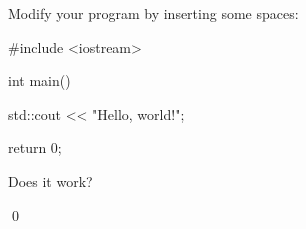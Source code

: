 Modify your program by inserting some spaces:

\begin{console}

#include <iostream>



int main()

{

    std::cout            << "Hello, world!\n";



    return 0;

}

\end{console}

Does it work?

\qed

